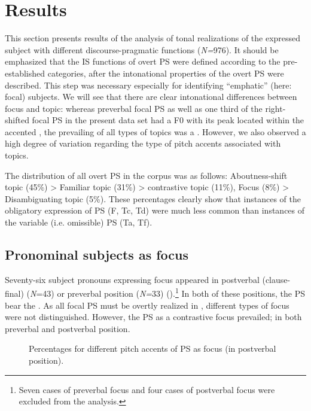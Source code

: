 \documentclass[output=paper]{langsci/langscibook}
\begin{document}
\section{Results}
\label{sec:pes:4}
This section presents results of the analysis of tonal realizations of the expressed subject with different discourse-pragmatic functions (\textit{N=}976). It should be emphasized that the IS functions of overt PS were defined according to the pre-established categories, after the intonational properties of the overt PS were described. This step was necessary especially for identifying ``emphatic'' (here: focal) subjects. We will see that there are clear intonational differences between focus and topic: whereas preverbal focal PS as well as one third of the right-shifted focal PS in the present data set had a F0  with its peak located within the accented , the prevailing  of all types of topics was a . However, we also observed a high degree of variation regarding the type of pitch accents associated with topics.\pagebreak

The distribution of all overt PS in the corpus was as follows: Aboutness-shift topic (45\%) > Familiar topic (31\%) > contrastive topic (11\%), Focus (8\%) > Disambiguating topic (5\%). These percentages clearly show that instances of the obligatory expression of PS (F, Tc, Td) were much less common than instances of the variable (i.e. omissible) PS (Ta, Tf).
  
\subsection{Pronominal subjects as focus}
\label{sec:pes:4.1}
Seventy-six subject pronouns expressing focus appeared in postverbal (clause-final) (\textit{N}=43) or preverbal position (\textit{N=}33) ().\footnote{Seven cases of preverbal focus and four cases of postverbal focus were excluded from the analysis.} In both of these positions, the PS bear the . As all focal PS must be overtly realized in , different types of focus were not distinguished. However, the PS as a contrastive focus prevailed; in both preverbal and postverbal position.


\begin{figure}
\caption{Percentages for different pitch accents of PS as focus (in postverbal position).\label{fig:pes:7}}
\end{figure}
\end{document}
